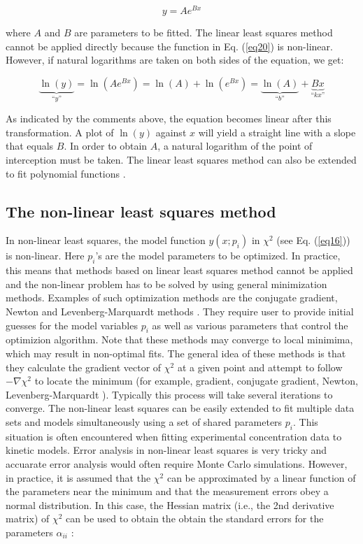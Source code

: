 \documentclass[byrevtex,amssymb,aps,pra,floatfix,letterpaper]{revtex4}
\begin{document}
\begin{equation}
\label{eq20}
y = Ae^{Bx}
\end{equation}

\noindent
where $A$ and $B$ are parameters to be fitted. The linear least squares method cannot be applied
directly because the function in Eq. (\ref{eq20}) is non-linear. However, if natural logarithms are taken on
both sides of the equation, we get:

\begin{equation}
\label{eq21}
\underbrace{\ln(y)}_\textit{``y''} = \ln(Ae^{Bx}) = \ln(A) + \ln(e^{Bx}) = \underbrace{\ln(A)}_\textit{``b''} + \underbrace{Bx}_\textit{``kx''}
\end{equation}

\noindent
As indicated by the comments above, the equation becomes linear after this transformation. A
plot of $\ln(y)$ against $x$ will yield a straight line with a slope that equals $B$. In order to obtain $A$, a
natural logarithm of the point of interception must be taken. The linear least squares method can also be extended
to fit polynomial functions \cite{NUMREP}.

\subsection{The non-linear least squares method}

In non-linear least squares, the model function $y(x; p_i)$ in $\chi^2$ (see Eq. (\ref{eq16})) is non-linear. Here $p_i$'s are the model parameters to be optimized. In practice, this means that methods based on linear least squares method cannot be applied and the non-linear problem has to be solved by using general minimization methods. Examples of such optimization methods are the conjugate gradient, Newton and Levenberg-Marquardt methods \cite{NUMREP}. They require user to provide initial guesses for the model variables $p_i$ as well as various parameters that control the optimizion algorithm. Note that these methods may converge to local minimima, which may result in non-optimal fits. The general idea of these methods is that they calculate the gradient vector of $\chi^2$ at a given point and attempt to follow $-\nabla\chi^2$ to locate the minimum (for example, gradient, conjugate gradient, Newton, Levenberg-Marquardt \cite{NUMREP}). Typically this process will take several iterations to converge. The non-linear least squares can be easily extended to fit multiple data sets and models simultaneously using a set of shared parameters $p_i$. This situation is often encountered when fitting experimental concentration data to kinetic models. Error analysis in non-linear least squares is very tricky and accuarate error analysis would often require Monte Carlo simulations. However, in practice, it is assumed that the $\chi^2$ can be approximated by a linear function of the parameters near the minimum and that the measurement errors obey a normal distribution. In this case, the Hessian matrix (i.e., the 2nd derivative matrix) of $\chi^2$ can be used to obtain the obtain the standard errors for the parameters $\alpha_{ii}$ \cite{NUMREP}:
\end{document}
